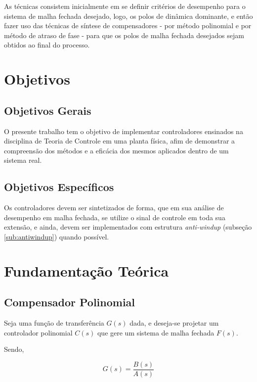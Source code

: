 \documentclass[conference,harvard,brazil,english]{sbatex}
\begin{document}
        As técnicas consistem inicialmente em se definir critérios de desempenho para o sistema de malha fechada desejado, logo, os polos de dinâmica dominante, e então fazer uso das técnicas de síntese de compensadores - por método polinomial e por método de atraso de fase - para que os polos de malha fechada desejados sejam obtidos ao final do processo.
    
        
    \section{Objetivos}
        
    \subsection{Objetivos Gerais}
        
        O presente trabalho tem o objetivo de 
        implementar controladores ensinados na disciplina de Teoria de Controle em uma planta física, afim de demonstrar a compreensão dos métodos e a eficácia dos mesmos aplicados dentro de um sistema real.
    
    \subsection{Objetivos Específicos}
        
        Os controladores devem ser sintetizados de forma, que em sua análise de desempenho em malha fechada, se utilize o sinal de controle em toda sua extensão, e ainda, devem ser implementados com estrutura \textit{anti-windup} (subseção \ref{sub:antiwindup}) quando possível.
    
    \section{Fundamentação Teórica}
        
        \subsection{Compensador Polinomial}
        
            Seja uma função de transferência $G(s)$ dada, e deseja-se projetar um controlador polinomial $C(s)$ que gere um sistema de malha fechada $F(s)$. 
            
            Sendo,
            
            \begin{equation}
                \label{equ:Gs}
                G(s) = \frac{B(s)}{A(s)}
            \end{equation}
            
\end{document}
